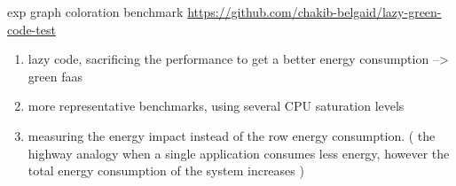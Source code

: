 exp graph coloration benchmark
\url{https://github.com/chakib-belgaid/lazy-green-code-test}



\begin{enumerate}
      \item lazy code, sacrificing the performance to get a better energy consumption --> green faas
      \item more representative benchmarks, using several CPU saturation levels
      \item measuring the energy impact instead of the row energy consumption. ( the highway analogy when a single application consumes less energy, however the total energy consumption of the system increases )
\end{enumerate}
\vfill \strut  %
\cleardoublepage